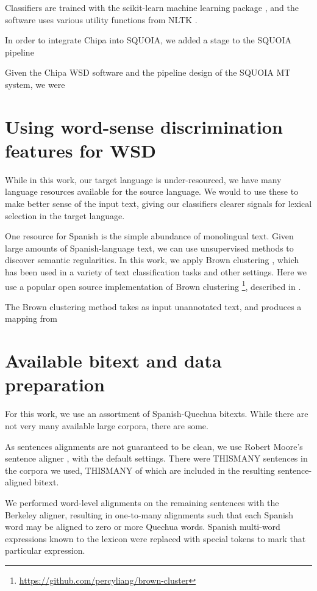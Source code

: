 \documentclass[10pt, a4paper]{article}
\begin{document}
Classifiers are trained with the scikit-learn machine learning package
\cite{scikit-learn}, and the software uses various utility functions from NLTK
\cite{nltkbook}.

In order to integrate Chipa into SQUOIA, we added a stage to the SQUOIA
pipeline

Given the Chipa WSD software and the pipeline design of the SQUOIA MT system,
we were



\section{Using word-sense discrimination features for WSD}
While in this work, our target language is under-resourced, we have many
language resources available for the source language. We would to use these to
make better sense of the input text, giving our classifiers clearer signals for
lexical selection in the target language.

One resource for Spanish is the simple abundance of monolingual text. Given
large amounts of Spanish-language text, we can use unsupervised methods to
discover semantic regularities. In this work, we apply Brown clustering
\cite{Brown92class-basedn-gram}, which has been used in a variety of text
classification tasks and other settings. Here we use a popular open source
implementation of Brown clustering
\footnote{\url{https://github.com/percyliang/brown-cluster}}, described in
\cite{Liang05semi-supervisedlearning}.

The Brown clustering method takes as input unannotated text, and produces a
mapping from 

\section{Available bitext and data preparation}
For this work, we use an assortment of Spanish-Quechua bitexts.
While there are not very many available large corpora, there are some.

As sentences alignments are not guaranteed to be clean, we use Robert Moore's
sentence aligner \cite{DBLP:conf/amta/Moore02}, with the default settings.
There were THISMANY sentences in the corpora we used, THISMANY of which are
included in the resulting sentence-aligned bitext.

We performed word-level alignments on the remaining sentences with the Berkeley
aligner, resulting in one-to-many alignments such that each Spanish word may be
aligned to zero or more Quechua words. Spanish multi-word expressions known to
the lexicon were replaced with special tokens to mark that particular
expression.
\end{document}
